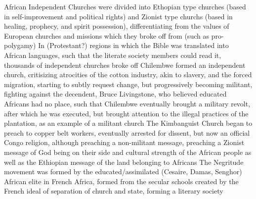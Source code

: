 \documentclass[11 pt, twoside]{article}
\newenvironment{outline*}
{
	\begin{outline}[enumerate]
	}
	{\end{outline}
}
\begin{document}
\begin{outline*}
		\3 African Independent Churches were divided into Ethopian type churches (based in self-improvement and political rights) and Zionist type churchs (based in healing, prophecy, and spirit possession), differentiating from the values of European churches and missions which they broke off from (such as pro-polygamy)
			\4 In (Protestant?) regions in which the Bible was translated into African languages, such that the literate society members could read it, thousands of independent churches broke off
			\4 Chilembwe formed an independent church, critisizing atrocities of the cotton industry, akin to slavery, and the forced migration, starting to subtly request change, but progressively becoming militant, fighting against the decendent, Bruce Livingstone, who believed educated Africans had no place, such that Chilembwe eventually brought a military revolt, after which he was executed, but brought attention to the illegal practices of the plantation, as an example of a militant church
			\4 The Kimbanguist Church began to preach to copper belt workers, eventually arrested for dissent, but now an official Congo religion, although preaching a non-militant message, preaching a Zionist message of God being on their side and cultural strength of the African people as well as the Ethiopian message of the land belonging to Africans
		\3 The Negritude movement was formed by the educated/assimilated (Cesaire, Damas, Senghor) African elite in French Africa, formed from the secular schools created by the French ideal of separation of church and state, forming a literary society
\end{outline*}
\end{document}
